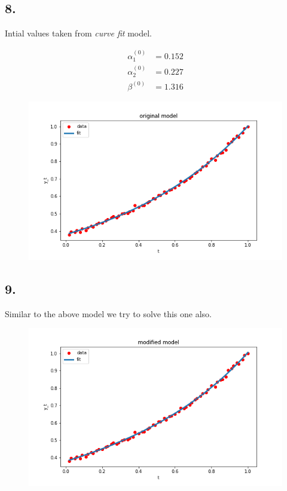 \documentclass{article}
\begin{document}
\subsection*{8.}
Intial values taken from \textit{curve fit} model.

\begin{align*}
    \alpha_1^{(0)}&=0.152\\
    \alpha_2^{(0)}&=0.227\\
    \beta^{(0)}&=1.316
\end{align*}

\begin{figure}[H]
    \includegraphics[]{plots/q8-1.png}
\end{figure}

\subsection*{9.}
Similar to the above model we try to solve this one also.
\begin{figure}[H]
    \includegraphics[]{plots/q9-1.png}
\end{figure}
\end{document}
